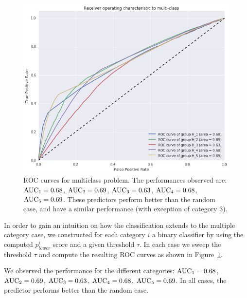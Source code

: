 \begin{figure}
\centering
\includegraphics[width=0.75\columnwidth]{figures/ROC_multiclass/ROC_multiclass.png}
\caption{ROC curves for multiclass problem. The performances observed are: $\operatorname{AUC}_1 = 0.68$, $\operatorname{AUC}_2 = 0.69$, $\operatorname{AUC}_3 = 0.63$, $\operatorname{AUC}_4 = 0.68$, $\operatorname{AUC}_5 = 0.69$. These predictors perform better than the random case, and have a similar performance (with exception of category 3).}
\label{roc_multiple_categories}
\end{figure}

In order to gain an intuition on how the classification extends to the multiple category case, we constructed for each category $i$ a binary classifier by using the computed $p^i_{lower}$ score and a given threshold $\tau$. In each case we sweep the threshold $\tau$ and compute the resulting ROC curves as shown in Figure~\ref{roc_multiple_categories}.

We observed the performance for the different categories: $\operatorname{AUC}_1 = 0.68$, $\operatorname{AUC}_2 = 0.69$, $\operatorname{AUC}_3=0.63$, $\operatorname{AUC}_4 = 0.68$, $\operatorname{AUC}_5 = 0.69$. In all cases, the predictor performs better than the random case.


